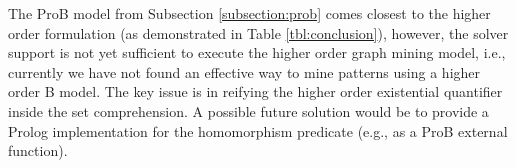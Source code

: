 The ProB model from Subsection \ref{subsection:prob} comes closest to the higher order formulation (as demonstrated in Table \ref{tbl:conclusion}), however, the solver support is not yet sufficient to execute the higher order graph mining model, i.e., currently we have not found an effective way to mine patterns using a higher order B model. The key issue is in reifying the higher order existential quantifier inside the set comprehension. A possible future solution would be to provide a Prolog implementation for the homomorphism predicate (e.g., as a ProB external function).
